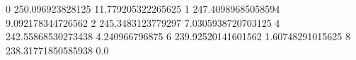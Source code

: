 0 250.096923828125 11.779205322265625
1 247.40989685058594 9.092178344726562
2 245.3483123779297 7.0305938720703125
4 242.55868530273438 4.240966796875
6 239.92520141601562 1.60748291015625
8 238.31771850585938 0.0
